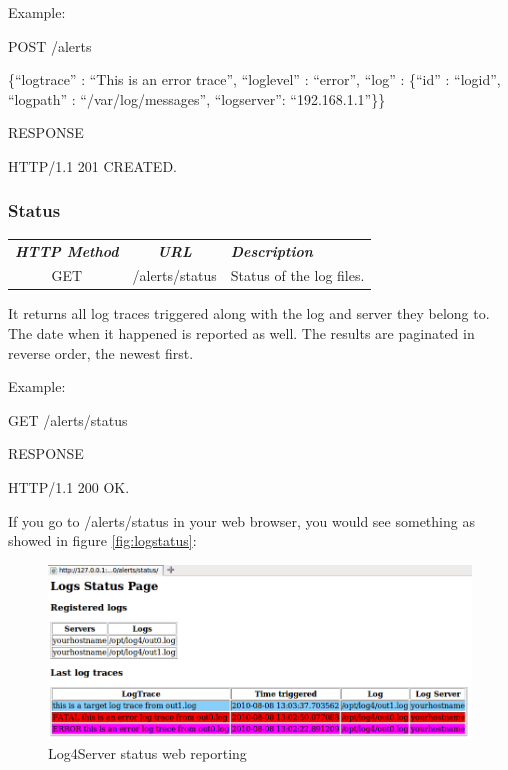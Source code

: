 \noindent
Example:

\begin{codeexample}

POST /alerts

 \{``logtrace'' : ``This is an error trace'', 
   ``loglevel'' : ``error'',
   ``log'' : \{``id'' : ``logid'', ``logpath'' : ``/var/log/messages'', ``logserver'': ``192.168.1.1''\}\} 

RESPONSE

HTTP/1.1 201 CREATED.
\end{codeexample}

\subsubsection{Status}

\begin{flushleft}
 \begin{tabular}{|c|c|l|}
 \hline 
 \rowcolor{cyan} {\color{white} \textit{\textbf{HTTP Method}}} &  {\color{white} 
  \textit{\textbf{URL}}}  & {\color{white} 
 \textit{\textbf{Description}}}\\
 GET & /alerts/status & Status of the log files.\\
 \hline
\end{tabular}
\end{flushleft}
It returns all log traces triggered along with the log and server they belong to. The 
date when it happened is reported as well. The results are paginated in reverse
order, the newest first.

\noindent
Example:

\begin{codeexample}

GET /alerts/status

RESPONSE

HTTP/1.1 200 OK.
\end{codeexample}


\noindent
If you go to /alerts/status in your web browser, you would see something as showed in figure 
\autoref{fig:logstatus}:

\begin{figure}[ht]
\includegraphics[scale=0.50]{logstatus.png}
\caption{Log4Server status web reporting}\label{fig:logstatus}
\end{figure}


